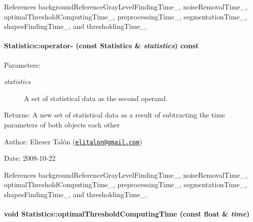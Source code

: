 References backgroundReferenceGrayLevelFindingTime\_\-, noiseRemovalTime\_\-, optimalThresholdComputingTime\_\-, preprocessingTime\_\-, segmentationTime\_\-, shapesFindingTime\_\-, and thresholdingTime\_\-.\hypertarget{class_statistics_529bed34d909d88440214d6983779043}{
\paragraph[{operator-}]{ Statistics::operator- (const {\bf Statistics} \& {\em statistics}) const}\hfill}
\label{class_statistics_529bed34d909d88440214d6983779043}


\begin{Desc}
\item[Parameters:]
\begin{description}
\item[{\em statistics}]A set of statistical data as the second operand.\end{description}
\end{Desc}
\begin{Desc}
\item[Returns:]A new set of statistical data as a result of subtracting the time parameters of both objects each other\end{Desc}
\begin{Desc}
\item[Author:]Eliezer Talón (\href{mailto:elitalon@gmail.com}{\tt elitalon@gmail.com}) \end{Desc}
\begin{Desc}
\item[Date:]2008-10-22 \end{Desc}


References backgroundReferenceGrayLevelFindingTime\_\-, noiseRemovalTime\_\-, optimalThresholdComputingTime\_\-, preprocessingTime\_\-, segmentationTime\_\-, shapesFindingTime\_\-, and thresholdingTime\_\-.\hypertarget{class_statistics_90380f820c043813aafb85c1dc9a6393}{
\paragraph[{optimalThresholdComputingTime}]{\setlength{\rightskip}{0pt plus 5cm}void Statistics::optimalThresholdComputingTime (const float \& {\em time})}\hfill}
\label{class_statistics_90380f820c043813aafb85c1dc9a6393}


